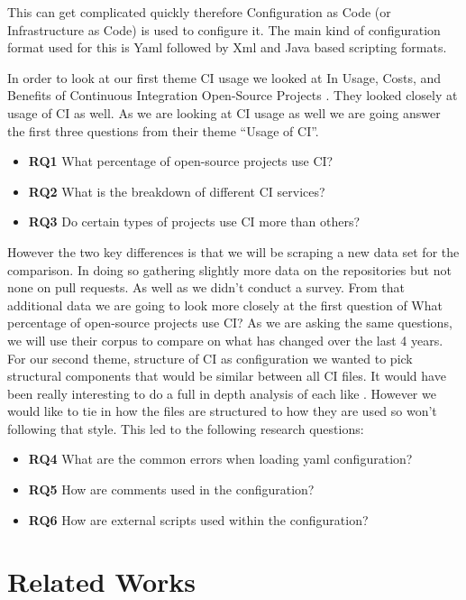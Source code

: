 \documentclass[twoside,12pt,titlepage,a4paper]{article}
\begin{document}
This can get complicated quickly therefore Configuration as Code (or Infrastructure as Code) is used to configure it. The main kind of configuration format used for this is Yaml followed by Xml and Java based scripting formats.


In order to look at our first theme CI usage we looked at In Usage, Costs, and Benefits of Continuous Integration Open-Source Projects \cite{Hilton2016}. They looked closely at usage of CI as well. As we are looking at CI usage as well we are going answer the first three questions from their theme \enquote{Usage of CI}. 
\begin{itemize}
  \item \textbf{RQ1} What percentage of open-source projects use CI?
  \item \textbf{RQ2} What is the breakdown of different CI services?
  \item \textbf{RQ3} Do certain types of projects use CI more than others?
\end{itemize}

However the two key differences is that we will be scraping a new data set for the comparison. In doing so gathering slightly more data on the repositories but not none on pull requests. As well as we didn't conduct a survey. From that additional data we are going to look more closely at the first question of What percentage of open-source projects use CI?
As we are asking the same questions, we will use their corpus to compare on what has changed over the last 4 years. 
For our second theme, structure of CI as configuration we wanted to pick structural components that would be similar between all CI files. It would have been really interesting to do a full in depth analysis of each like \citet{Gallaba2018}. However we would like to tie in how the files are structured to how they are used so won't following that style. This led to the following research questions:
\begin{itemize}
  \item \textbf{RQ4} What are the common errors when loading yaml configuration?
  \item \textbf{RQ5} How are comments used in the configuration?
  \item \textbf{RQ6} How are external scripts used within the configuration?
\end{itemize}

\section{Related Works}
\vspace*{-0.05in}
\end{document}
